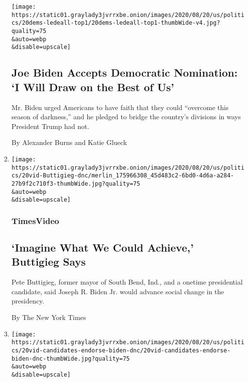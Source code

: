 \begin{enumerate}
  \texttt{[image: https://static01.graylady3jvrrxbe.onion/images/2020/08/20/us/politics/20dems-ledeall-top1/20dems-ledeall-top1-thumbWide-v4.jpg?quality=75\\\&auto=webp\\\&disable=upscale]}

  \hypertarget{joe-biden-accepts-democratic-nomination-i-will-draw-on-the-best-of-us}{%
  \subsection{Joe Biden Accepts Democratic Nomination: `I Will Draw on
  the Best of
  Us'}\label{joe-biden-accepts-democratic-nomination-i-will-draw-on-the-best-of-us}}

  Mr. Biden urged Americans to have faith that they could ``overcome
  this season of darkness,'' and he pledged to bridge the country's
  divisions in ways President Trump had not.

  By Alexander Burns and Katie Glueck
\item
  \href{/video/us/elections/100000007299812/pete-buttigieg-speaks-dnc.html}{}

  \texttt{[image: https://static01.graylady3jvrrxbe.onion/images/2020/08/20/us/politics/20vid-Buttigieg-dnc/merlin\_175966308\_45d483c2-6bd0-4d6a-a284-27b9f2c710f3-thumbWide.jpg?quality=75\\\&auto=webp\\\&disable=upscale]}

  \hypertarget{timesvideo-3}{%
  \subsubsection{TimesVideo}\label{timesvideo-3}}

  \hypertarget{imagine-what-we-could-achieve-buttigieg-says}{%
  \subsection{`Imagine What We Could Achieve,' Buttigieg
  Says}\label{imagine-what-we-could-achieve-buttigieg-says}}

  Pete Buttigieg, former mayor of South Bend, Ind., and a onetime
  presidential candidate, said Joseph R. Biden Jr. would advance social
  change in the presidency.

  By The New York Times
\item
  \href{/video/us/elections/100000007299914/2020-candidates-endorse-biden-dnc.html}{}

  \texttt{[image: https://static01.graylady3jvrrxbe.onion/images/2020/08/20/us/politics/20vid-candidates-endorse-biden-dnc/20vid-candidates-endorse-biden-dnc-thumbWide.jpg?quality=75\\\&auto=webp\\\&disable=upscale]}


\end{enumerate}
